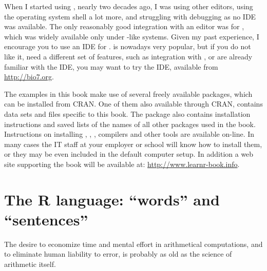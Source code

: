 \documentclass[krantz2]{krantz}\usepackage{knitr}%
\begin{document}
When I started using \Rpgrm, nearly two decades ago, I was using other editors, using the operating system shell a lot more, and struggling with debugging as no IDE was available. The only reasonably good integration with an editor was for , which was widely available only under -like systems. Given my past experience, I encourage you to use an IDE for \Rpgrm. \RStudio is nowadays very popular, but if you do not like it, need a different set of features, such as integration with , or are already familiar with the  IDE, you may want to try the  IDE, available from \url{http://bio7.org}.

The examples in this book make use of several freely available packages, which can be installed from CRAN. One of them  also available through CRAN, contains data sets and files specific to this book. The  package also contains installation instructions and saved lists of the names of all other packages used in the book. Instructions on installing \Rpgrm, , \RStudio, compilers and other tools are available on-line. In many cases the IT staff at your employer or school will know how to install them, or they may be even included in the default computer setup. In addition a web site supporting the book will be available at: \url{http://www.learnr-book.info}.








\chapter{The R language: ``words'' and ``sentences''}\label{chap:R:as:calc}

\begin{VF}
The desire to economize time and mental effort in arithmetical computations, and to eliminate human liability to error, is probably as old as the science of arithmetic itself.

\end{VF}

\end{document}
